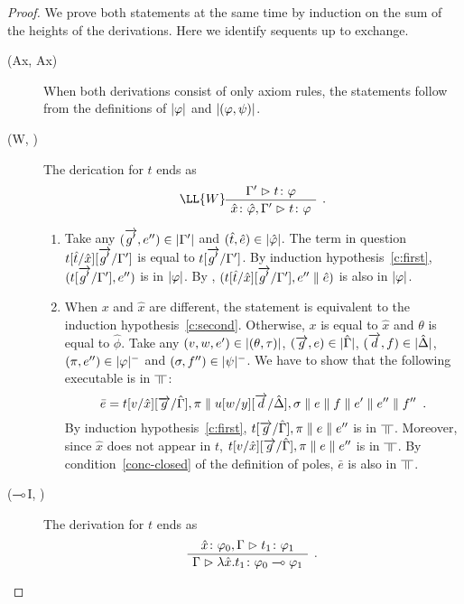 \begin{proof}
 We prove both statements at the same time by induction on the sum of
 the heights of the derivations.  Here we identify sequents up to exchange.
  \begin{description}
  \item[(Ax, Ax)] When both derivations consist of only axiom rules,
       the statements follow from the definitions of $|{\varphi}|$ and
       $|{(\varphi,\psi)}|$.
   \item[(W, \textminus)]
	The derication for $t$ ends as
	\[
	 \aseq{\G'}{\tj{t}{\phi}}
	\LL{W}
	\useq{\tj{\hat{x}}{\hat{\phi}}, \G'}{\tj{t}{\phi}}
	\DisplayProof\enspace.
	\]
	\begin{enumerate}[label=\textit{(\arabic{*})}]
	 \item Take any $(\overrightarrow{g'}, e'')\in|{\Gamma'}|$ and $(\hat t,\hat
	       e)\in|{\hat{\varphi}}|$.
	       The term in question $t[\hat t/\hat x][\overrightarrow{g'}/\Gamma']$ is
	       equal to $t[\overrightarrow{g'}/\Gamma']$.
	       By induction hypothesis~\ref{c:first},
	       $(t[\overrightarrow{g'}/\Gamma'],e'')$ is in $|{\varphi}|$.
	       By , $(t[\hat t/\hat x][\overrightarrow{g'}/\Gamma'],
	       e''\parallel \hat e)$ is also in $|{\varphi}|$.
	 \item
	       When $x$ and $\hat x$ are different, the statement is
	       equivalent to the induction hypothesis~\ref{c:second}.
	      Otherwise, $x$ is equal to $\hat x$ and $\theta$ is equal
	      to $\hat\phi$.
	      Take any
	      $(v,w,e')\in|{(\theta,\tau)}|$,
	      $(\overrightarrow g,e)\in|{\hat{\Gamma}}|$,
	      $(\overrightarrow d,f)\in|{\hat{\Delta}}|$,
	      $(\pi,e'')\in|{\varphi}|^-$ and
	      $(\sigma,f'')\in|{\psi}|^-$.
	      We have to show that the following executable is in
	      $\bbot$:
	      \[
	       \bar e = t[v/\hat x][\overrightarrow{g}/\hat{\Gamma}],\pi\parallel
	      u[w/y][\overrightarrow d/\hat {\Delta}], \sigma\parallel e\parallel f\parallel e'\parallel
	      e''\parallel f''\enspace.
	      \]
	      By induction hypothesis~\ref{c:first},
	      $
	       t[\overrightarrow g/\hat {\Gamma}],\pi\parallel e\parallel e''
	      $
	      is in $\bbot$.  Moreover, since $\hat x$ does not appear
	      in $t$,  $t[v/\hat x][\overrightarrow g/\hat {\Gamma}],\pi\parallel e\parallel e''$
	      is in $\bbot$.  By condition~\ref{conc-closed} of the
	      definition of poles, $\bar e$ is also in $\bbot$.
	\end{enumerate}
   \item[($\multimap$I, \textminus)]
	The derivation for $t$ ends as
	\[
	\aseq{\tj{\hat x}{\phi_0},\G}{\tj{t_1}{\phi_1}}
	\useq{\G}{\tj{\lambda{\hat{x}}.t_1}{\phi_0\limp\phi_1}}
	\DisplayProof\enspace.
	\]
	\begin{enumerate}[label=\textit{(\arabic{*})}]

\end{enumerate}
\end{description}
\end{proof}
